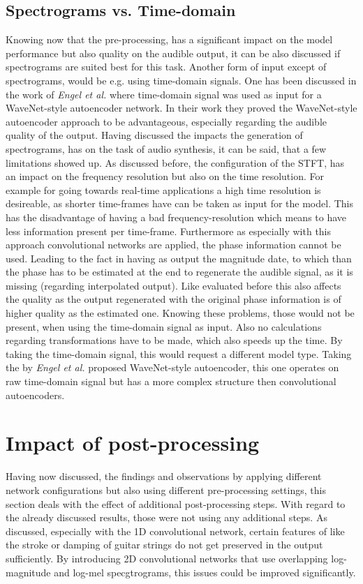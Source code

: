 \subsection{Spectrograms vs. Time-domain}
Knowing now that the pre-processing, has a significant impact on the model performance but also quality on the audible output, it can be also discussed if spectrograms are suited best for this task. Another form of input except of spectrograms, would be e.g. using time-domain signals. One has been discussed in the work of \textit{Engel et al.} \cite{Engel2017} where time-domain signal was used as input for a WaveNet-style autoencoder network. In their work they proved the WaveNet-style autoencoder approach to be advantageous, especially regarding the audible quality of the output. Having discussed the impacts the generation of spectrograms, has on the task of audio synthesis, it can be said, that a few limitations showed up. As discussed before, the configuration of the STFT, has an impact on the frequency resolution but also on the time resolution. For example for going towards real-time applications a high time resolution is desireable, as shorter time-frames have can be taken as input for the model. This has the disadvantage of having a bad frequency-resolution which means to have less information present per time-frame. Furthermore as especially with this approach convolutional networks are applied, the phase information cannot be used. Leading to the fact in having as output the magnitude date, to which than the phase has to be estimated at the end to regenerate the audible signal, as it is missing (regarding interpolated output). Like evaluated before this also affects the quality as the output regenerated with the original phase information is of higher quality as the estimated one. Knowing these problems, those would not be present, when using the time-domain signal as input. Also no calculations regarding transformations have to be made, which also speeds up the time. By taking the time-domain signal, this would request a different model type. Taking the by \textit{Engel et al.} proposed WaveNet-style autoencoder, this one operates on raw time-domain signal but has a more complex structure then convolutional autoencoders.

\section{Impact of post-processing}
Having now discussed, the findings and observations by applying different network configurations but also using different pre-processing settings, this section deals with the effect of additional post-processing steps. With regard to the already discussed results, those were not using any additional steps. As discussed, especially with the 1D convolutional network, certain features of like the stroke or damping of guitar strings do not get preserved in the output sufficiently. By introducing 2D convolutional networks that use overlapping log-magnitude and log-mel specgtrograms, this issues could be improved significantly. 

